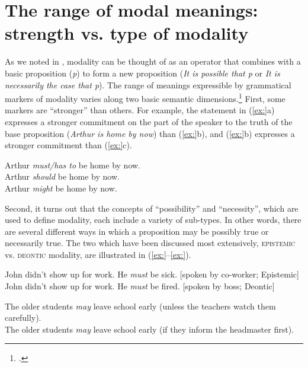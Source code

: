 \section{The range of modal meanings: strength vs. type of modality}\label{sec:} %

As we noted in , modality can be thought of as an operator that combines with a basic proposition (\textit{p}) to form a new proposition (\textit{It is possible that p} or \textit{It is necessarily the case that p}). The range of meanings expressible by grammatical markers of modality varies along two basic semantic dimensions.\footnote{\citet{Hacquard2011}.} First, some markers are “stronger” than others. For example, the statement in (\ref{ex:}a) expresses a stronger commitment on the part of the speaker to the truth of the base proposition (\textit{Arthur is home by now}) than (\ref{ex:}b), and (\ref{ex:}b) expresses a stronger commitment than (\ref{ex:}c).


\ea
\ea Arthur \textit{must/has to} be home by now.\\
\ex Arthur \textit{should} be home by now.\\
\ex Arthur \textit{might} be home by now.
                       \z
\z


Second, it turns out that the concepts of “possibility” and “necessity”, which are used to define modality, each include a variety of sub-types. In other words, there are several different ways in which a proposition may be possibly true or necessarily true. The two which have been discussed most extensively, \textsc{epistemic} vs. \textsc{deontic} modality, are illustrated in (\ref{ex:}--\ref{ex:}).


\ea
\ea John didn’t show up for work. He \textit{must} be sick.  [spoken by co-worker; Epistemic]\\
\ex John didn’t show up for work. He \textit{must} be fired.  [spoken by boss; Deontic]
                       \z
\z

\ea
\ea The older students \textit{may} leave school early (unless the teachers watch them carefully).\\
\ex The older students \textit{may} leave school early (if they inform the headmaster first).
                       \z
\z


